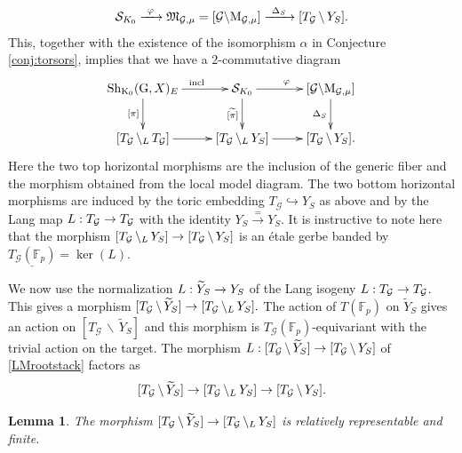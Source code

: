 \documentclass[reqno, 10pt]{amsart}
\makeatletter
\newcommand{\fkM}{\ensuremath{\mathfrak{M}}\xspace}
\newcommand{\BF}{\ensuremath{\mathbb {F}}\xspace}
\newcommand{\CG}{\ensuremath{\mathcal {G}}\xspace}
\newcommand{\CS}{\ensuremath{\mathcal {S}}\xspace}
\newcommand{\RG}{\ensuremath{\mathrm {G}}\xspace}
\newcommand{\RK}{\ensuremath{\mathrm {K}}\xspace}
\newcommand{\wt}{\widetilde}
\newcommand{\bs}{\backslash}
\newtheorem{lemma}[subsubsection]{Lemma}
\theoremstyle{definition}
\numberwithin{equation}{subsection}
\numberwithin{subsubsection}{subsection}
\renewcommand{\to}{%
   \ifbool{@display}{\longrightarrow}{\rightarrow}%
   }
\newcommand{\und}{\underline}
\newcommand{\Mloc}{{\rm M}}
\newcommand{\LBS}{\, {\bs}_{\vphantom{A}{L}}\, }
\makeatother
\begin{document}
  \[
 \CS_{K_0}\xrightarrow{\ \varphi\ } \fkM_{\CG,\mu}=[\CG\bs \Mloc_{\CG,\mu}]\xrightarrow{\ \Delta_S\ }  [T_\CG\, \bs\,  Y_{S}].
  \]
This, together with the existence of the isomorphism $\alpha$ 
 in Conjecture \ref{conj:torsors}, implies that we 
 have a $2$-commutative diagram
\begin{equation}\label{StackDia1}
\begin{aligned}
 \xymatrix{
    {\rm Sh}_{\RK_0}(\RG, X)_E \ar[r]^{\rm\ \ incl} \ar[d]_{[\pi]}  &     \CS_{K_0}\ar[r]^{\varphi} \ar[d]_{\wt{[\pi]}} & [\CG\bs \Mloc_{\CG,\mu}]\ar[d]_{\Delta_S}\\
      [T_\CG  \LBS T_\CG ] \ar[r]  & [T_\CG \LBS Y_S ]  \ar[r]  & [T_\CG\, \bs\, Y_S ].
        }
        \end{aligned}
\end{equation}
Here the two top horizontal morphisms are the inclusion of the generic fiber and the morphism obtained from the  local model diagram.
The two bottom horizontal morphisms are induced by the toric embedding $T_\CG\hookrightarrow Y_S$ as above and by  the 
Lang map $L: T_\CG \to T_\CG $ with the identity $Y_S\xrightarrow{=}Y_S$.
It is instructive to note here that the morphism $[T_\CG \LBS Y_S ]  \to [T_\CG\, \bs\, Y_S ]$ is an \'etale gerbe banded by $\und{T_\CG(\BF_p)}=\ker(L)$.


 
  
  We now use the normalization $L: \wt Y_S\to Y_S$ of the Lang isogeny $L: T_\CG\to T_\CG$. This gives  a morphism
$
  [T_\CG\, \bs\, \wt Y_S]\to [T_\CG  \LBS Y_S].
$
The action of $T(\BF_p)$ on $\wt Y_S$ gives an action on $[T_\CG\, \bs\, \wt Y_S]$ and this morphism is $T_\CG(\BF_p)$-equivariant with the trivial action on the target. 
The morphism $ L: [T_\CG\,\bs\, \wt Y_S]\to [T_\CG\, \bs\,  Y_S]$ of  \eqref{LMrootstack} factors as 
\begin{equation}\label{factorsT}
 [T_\CG\,\bs\, \wt Y_S]\to [T_\CG  \LBS Y_S]\to [T_\CG\, \bs\, Y_S].
\end{equation}
  \begin{lemma}\label{lem:representable}
  The morphism
  $
  [T_\CG\,\bs\, \wt Y_S]\to [T_\CG  \LBS Y_S] 
 $
  is relatively representable and finite.
  \end{lemma}
  
\end{document}
